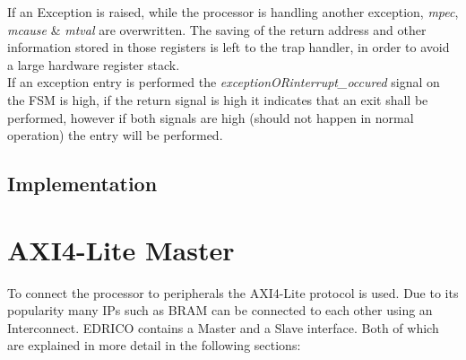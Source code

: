 If an Exception is raised, while the processor is handling another exception, \textit{mpec}, \textit{mcause} \& \textit{mtval} are overwritten. The saving of the return address and other information stored in those registers is left to the trap handler, in order to avoid a large hardware register stack.\\
If an exception entry is performed the \textit{exceptionORinterrupt\_occured} signal on the FSM is high, if the return signal is high it indicates that an exit shall be performed, however if both signals are high (should not happen in normal operation) the entry will be performed.

\subsection{Implementation}

\section{AXI4-Lite Master}
To connect the processor to peripherals the AXI4-Lite protocol is used. Due to its
popularity many IPs such as BRAM can be connected to each other using an
Interconnect. EDRICO contains a Master and a Slave interface. Both of which are
explained in more detail in the following sections:
